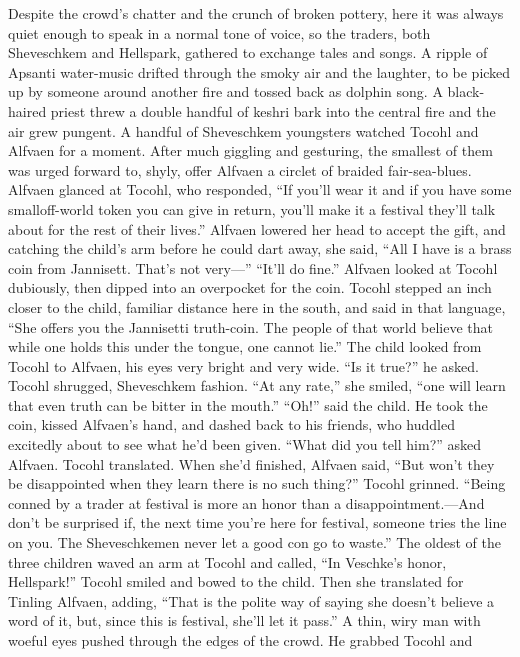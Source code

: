 \documentclass[9pt]{article}
\begin{document}
Despite the crowd’s chatter and the crunch of broken pottery, here it was always quiet enough to
speak in a normal tone of voice, so the traders, both Sheveschkem and Hellspark, gathered to exchange
tales and songs.
A ripple of Apsanti water-music drifted through the smoky air and the laughter, to be picked up by
someone around another fire and tossed back as dolphin song. A black-haired priest threw a double
handful of keshri bark into the central fire and the air grew pungent.
A handful of Sheveschkem youngsters watched Tocohl and Alfvaen for a moment. After much
giggling and gesturing, the smallest of them was urged forward to, shyly, offer Alfvaen a circlet of braided
fair-sea-blues. Alfvaen glanced at Tocohl, who responded, “If you’ll wear it and if you have some smalloff-world token you can give in return, you’ll make it a festival they’ll talk about for the rest of their lives.”
Alfvaen lowered her head to accept the gift, and catching the child’s arm before he could dart away,
she said, “All I have is a brass coin from Jannisett. That’s not very—”
“It’ll do fine.”
Alfvaen looked at Tocohl dubiously, then dipped into an overpocket for the coin. Tocohl stepped an
inch closer to the child, familiar distance here in the south, and said in that language, “She offers you the
Jannisetti truth-coin. The people of that world believe that while one holds this under the tongue, one
cannot lie.”
The child looked from Tocohl to Alfvaen, his eyes very bright and very wide. “Is it true?” he asked.
Tocohl shrugged, Sheveschkem fashion. “At any rate,” she smiled, “one will learn that even truth can
be bitter in the mouth.”
“Oh!” said the child. He took the coin, kissed Alfvaen’s hand, and dashed back to his friends, who
huddled excitedly about to see what he’d been given.
“What did you tell him?” asked Alfvaen. Tocohl translated. When she’d finished, Alfvaen said, “But
won’t they be disappointed when they learn there is no such thing?”
Tocohl grinned. “Being conned by a trader at festival is more an honor than a disappointment.—And
don’t be surprised if, the next time you’re here for festival, someone tries the line on you. The
Sheveschkemen never let a good con go to waste.”
The oldest of the three children waved an arm at Tocohl and called, “In Veschke’s honor,
Hellspark!”
Tocohl smiled and bowed to the child. Then she translated for Tinling Alfvaen, adding, “That is the
polite way of saying she doesn’t believe a word of it, but, since this is festival, she’ll let it pass.”
A thin, wiry man with woeful eyes pushed through the edges of the crowd. He grabbed Tocohl and
\end{document}
